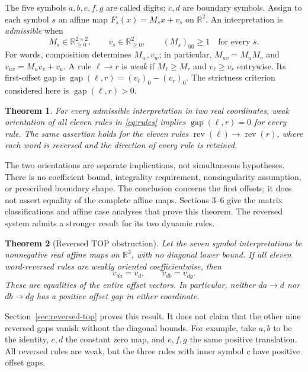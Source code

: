 \documentclass[11pt,a4paper]{article}
\newtheorem{theorem}{Theorem}
\newcommand{\R}{\mathbb R}
\newcommand{\nn}{\R_{\ge0}}
\newcommand{\gap}{\operatorname{gap}}
\newcommand{\rev}{\operatorname{rev}}
\begin{document}
The five symbols $a,b,e,f,g$ are called digits; $c,d$ are boundary symbols.
Assign to each symbol $s$ an affine map $F_s(x)=M_sx+v_s$ on $\R^2$.
An interpretation is \emph{admissible} when
\begin{equation}\label{eq:admissible}
M_s\in\nn^{2\times2},\qquad v_s\in\nn^2,\qquad (M_s)_{00}\ge1
\quad\text{for every }s.
\end{equation}
For words, composition determines $M_w,v_w$; in particular,
$M_{uv}=M_uM_v$ and $v_{uv}=M_uv_v+v_u$.
A rule $\ell\to r$ is \emph{weak} if $M_\ell\ge M_r$ and $v_\ell\ge v_r$
entrywise. Its first-offset gap is
$\gap(\ell,r)=(v_\ell)_0-(v_r)_0$.
The strictness criterion considered here is $\gap(\ell,r)>0$.

\begin{theorem}\label{thm:main}
For every admissible interpretation in two real coordinates, weak
orientation of all eleven rules in \eqref{eq:rules} implies
$\gap(\ell,r)=0$ for every rule. The same assertion holds for the eleven
rules $\rev(\ell)\to\rev(r)$, where each word is reversed and the direction
of every rule is retained.
\end{theorem}

The two orientations are separate implications, not simultaneous
hypotheses. There is no coefficient bound, integrality requirement,
nonsingularity assumption, or prescribed boundary shape. The conclusion
concerns the first offsets; it does not assert equality of the complete
affine maps. Sections 3--6 give the matrix classifications and affine case analyses
that prove this theorem. The reversed system admits a stronger result
for its two dynamic rules.

\begin{theorem}[Reversed TOP obstruction]\label{thm:reversed-top}
Let the seven symbol interpretations be nonnegative real affine maps
on $\R^2$, with no diagonal lower bound. If all eleven word-reversed
rules are weakly oriented coefficientwise, then
\[
v_{da}=v_d,\qquad v_{db}=v_{dg}.
\]
These are equalities of the entire offset vectors. In particular,
neither $da\to d$ nor $db\to dg$ has a positive offset gap in either
coordinate.
\end{theorem}

Section~\ref{sec:reversed-top} proves this result. It does not claim
that the other nine reversed gaps vanish without the diagonal bounds.
For example, take $a,b$ to be the identity, $c,d$ the constant zero map,
and $e,f,g$ the same positive translation. All reversed rules are weak,
but the three rules with inner symbol $c$ have positive offset gaps.
\end{document}
